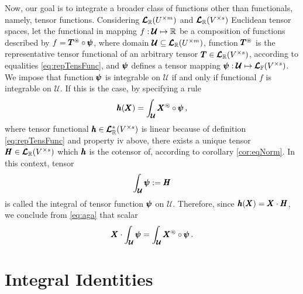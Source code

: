 Now, our goal is to integrate a broader class of functions other than functionals, namely, tensor functions. Considering $\pmb{\mathcal{L}}_{\mathbb{R}}(U^{\times m})$ and $\pmb{\mathcal{L}}_{\mathbb{R}}(V^{\times s})$ Euclidean tensor spaces, let the functional in mapping $f : \pmb{\mathcal{U}} \mapsto \mathbb{R}$ be a composition of functions described by $f = \pmb{{T}}^\circledast\circ\pmb{\psi}$, where domain $\pmb{\mathcal{U}}\subseteq\pmb{\mathcal{L}}_{\mathbb{R}}(U^{\times m})$, function $\pmb{{T}}^\circledast$ is the representative tensor functional of an arbitrary tensor $\pmb{T}\in\pmb{\mathcal{L}}_{\mathbb{R}}(V^{\times s})$, according to equalities \eqref{eq:repTensFunc}, and $\pmb{\psi}$ defines a tensor mapping $\pmb{\psi} : \pmb{\mathcal{U}} \mapsto \pmb{\mathcal{L}}_{\mathbb{F}}(V^{\times s})$. We impose that function $\pmb{\psi}$ is integrable on $\pmb{\mathcal{U}}$ if and only if functional $f$ is integrable on $\pmb{\mathcal{U}}$. If this is the case, by specifying a rule
\begin{equation}\label{eq:aga}
\pmb{h}(\pmb{X}) = \int_{\pmb{\mathcal{U}}} \pmb{{X}}^\circledast\circ\pmb{\psi}\,,
\end{equation}
where tensor functional $\pmb{h}\in\pmb{\mathcal{L}}_{\mathbb{R}}^*(V^{\times s})$ is linear because of definition \eqref{eq:repTensFunc} and property iv above, there exists a unique tensor $\pmb{H}\in\pmb{\mathcal{L}}_{\mathbb{R}}(V^{\times s})$ which $\pmb{h}$ is the cotensor of, according to corollary \ref{cor:eqNorm}. In this context, tensor
\begin{equation}
\int_{\pmb{\mathcal{U}}}\pmb{\psi}:=\pmb{H}
\end{equation}
is called the integral of tensor function $\pmb{\psi}$ on $\pmb{\mathcal{U}}$. Therefore, since $\pmb{h}(\pmb{X})=\pmb{X}\cdot\pmb{H}$, we conclude from \eqref{eq:aga} that scalar
\begin{equation}\label{eq:repInte}
\pmb{X}\cdot\int_{\pmb{\mathcal{U}}}\pmb{\psi}=\int_{\pmb{\mathcal{U}}} \pmb{{X}}^\circledast\circ\pmb{\psi}\,.
\end{equation}

\section{Integral Identities}

